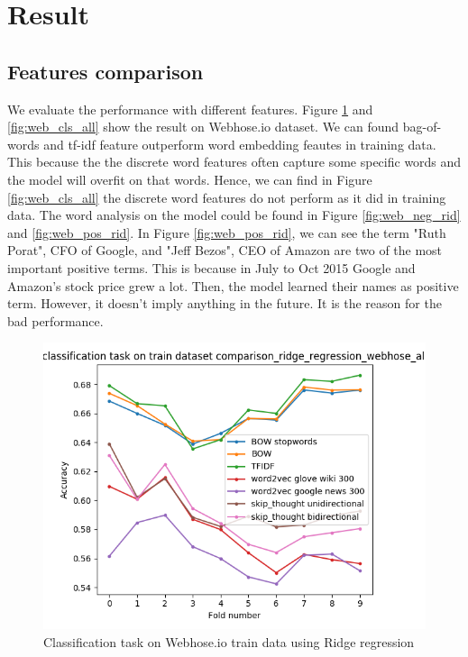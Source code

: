 \documentclass[sigconf]{acmart}
\begin{document}
\section{Result}
\subsection{Features comparison}
We evaluate the performance with different features. Figure \ref{fig:web_tr_cls_all} and \ref{fig:web_cls_all} show the result on Webhose.io dataset. We can found  bag-of-words and tf-idf feature outperform word embedding feautes
in training data. This because the the discrete word features often capture some specific words and the model will overfit on that words. Hence, we can find in Figure \ref{fig:web_cls_all} the discrete word features do not perform as it did
in training data. The word analysis on the model could be found in Figure \ref{fig:web_neg_rid} and \ref{fig:web_pos_rid}. In Figure \ref{fig:web_pos_rid}, we can see the term "Ruth Porat", CFO of Google, and "Jeff Bezos", CEO of Amazon
are two of the most important positive terms. This is because in July to Oct 2015 Google and Amazon's stock price grew a lot. Then, the model learned their names as positive term. However, it doesn't imply anything in the future. It is the reason
for the bad performance.

\begin{figure}
  \includegraphics[width=\linewidth]{../../picture/experiment/classification_train_comparison_ridge_regression_webhose_all.png}
  \caption{Classification task on Webhose.io train data using Ridge regression}
  \label{fig:web_tr_cls_all}
\end{figure}
\end{document}
